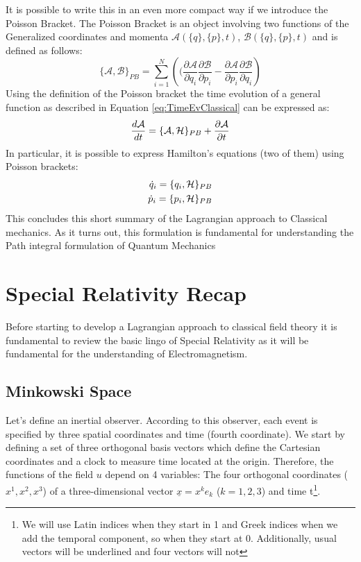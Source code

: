 It is possible to write this in an even more compact way if we introduce the Poisson Bracket. The Poisson Bracket is an object involving two functions of the Generalized coordinates and  momenta $\mathcal{A}(\{q\},\{p\},t)$, $\mathcal{B}(\{q\},\{p\},t)$ and is defined as follows:
\begin{equation}
    \{\mathcal{A},\mathcal{B}\}_{PB} = \sum_{i=1}^N\left((\frac{\partial\mathcal{A}}{\partial q_i}\frac{\partial \mathcal{B}}{\partial p_i} - \frac{\partial\mathcal{A}}{\partial p_i}\frac{\partial \mathcal{B}}{\partial q_i}\right)
    \label{eq:PoissonBracketdef}
\end{equation}
Using the definition of the Poisson bracket the time evolution of a general function as described in Equation \ref{eq:TimeEvClassical} can be expressed as:
\begin{equation}
    \frac{d\mathcal{A}}{dt} =   \{\mathcal{A},\mathcal{\mathcal{H}}\}_{PB} +\frac{\partial \mathcal{A}}{\partial t}
\end{equation}
In particular, it is possible to express Hamilton's equations (two of them) using Poisson brackets:
\begin{align}
    \dot q_i = \{q_i,\mathcal{H}\}_{PB}\\
    \dot p_i = \{p_i,\mathcal{H}\}_{PB}
\end{align}
This concludes this short summary of the Lagrangian approach to Classical mechanics. As it turns out, this formulation is fundamental for understanding the Path integral formulation of Quantum Mechanics
\section{Special Relativity Recap}
Before starting to develop a Lagrangian approach to classical field theory it is fundamental to review the basic lingo of Special Relativity as it will be fundamental for the understanding of Electromagnetism.
\subsection{Minkowski Space}
Let's define an inertial observer. According to this observer, each event is specified by three spatial coordinates and time (fourth coordinate). We start by defining a set of three orthogonal basis vectors which define the Cartesian coordinates and a clock to measure time located at the origin. Therefore, the functions of the field $u$ depend on 4 variables: The four orthogonal coordinates ($x^1,x^2,x^3$) of a three-dimensional vector $\underline x = x^k e_k$ ($k=1,2,3$) and time t\footnote{We will use Latin indices when they start in 1 and Greek indices when we add the temporal component, so when they start at 0. Additionally, usual vectors will be underlined and four vectors will not}.

